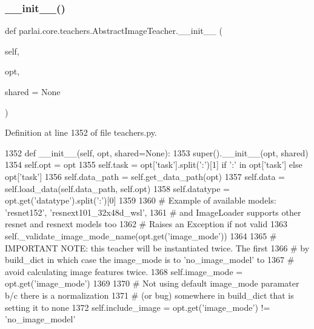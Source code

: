 \subsubsection{\texorpdfstring{\+\_\+\+\_\+init\+\_\+\+\_\+()}{\_\_init\_\_()}}
{\footnotesize\ttfamily def parlai.\+core.\+teachers.\+Abstract\+Image\+Teacher.\+\_\+\+\_\+init\+\_\+\+\_\+ (\begin{DoxyParamCaption}\item[{}]{self,  }\item[{}]{opt,  }\item[{}]{shared = {\ttfamily None} }\end{DoxyParamCaption})}



Definition at line 1352 of file teachers.\+py.


\begin{DoxyCode}
1352     \textcolor{keyword}{def }\_\_init\_\_(self, opt, shared=None):
1353         super().\_\_init\_\_(opt, shared)
1354         self.opt = opt
1355         self.task = opt[\textcolor{stringliteral}{'task'}].split(\textcolor{stringliteral}{':'})[1] \textcolor{keywordflow}{if} \textcolor{stringliteral}{':'} \textcolor{keywordflow}{in} opt[\textcolor{stringliteral}{'task'}] \textcolor{keywordflow}{else} opt[\textcolor{stringliteral}{'task'}]
1356         self.data\_path = self.get\_data\_path(opt)
1357         self.data = self.load\_data(self.data\_path, self.opt)
1358         self.datatype = opt.get(\textcolor{stringliteral}{'datatype'}).split(\textcolor{stringliteral}{':'})[0]
1359 
1360         \textcolor{comment}{# Example of available models: 'resnet152', 'resnext101\_32x48d\_wsl',}
1361         \textcolor{comment}{# and ImageLoader supports other resnet and resnext models too}
1362         \textcolor{comment}{# Raises an Exception if not valid}
1363         self.\_validate\_image\_mode\_name(opt.get(\textcolor{stringliteral}{'image\_mode'}))
1364 
1365         \textcolor{comment}{# IMPORTANT NOTE: this teacher will be instantiated twice. The first}
1366         \textcolor{comment}{# by build\_dict in which case the image\_mode is to 'no\_image\_model' to}
1367         \textcolor{comment}{# avoid calculating image features twice.}
1368         self.image\_mode = opt.get(\textcolor{stringliteral}{'image\_mode'})
1369 
1370         \textcolor{comment}{# Not using default image\_mode paramater b/c there is a normalization}
1371         \textcolor{comment}{# (or bug) somewhere in build\_dict that is setting it to none}
1372         self.include\_image = opt.get(\textcolor{stringliteral}{'image\_mode'}) != \textcolor{stringliteral}{'no\_image\_model'}

\end{DoxyCode}
